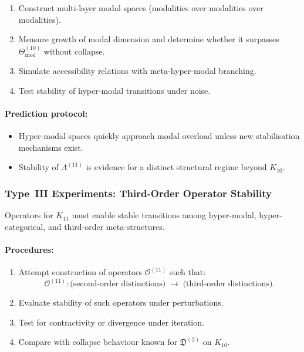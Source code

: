 \begin{enumerate}
    \item Construct multi-layer modal spaces 
          (modalities over modalities over modalities).
    \item Measure growth of modal dimension and 
          determine whether it surpasses 
          $\Theta_{\mathrm{mod}}^{(10)}$ without collapse.
    \item Simulate accessibility relations with 
          meta-hyper-modal branching.
    \item Test stability of hyper-modal transitions under noise.
\end{enumerate}

\paragraph{Prediction protocol:}

\begin{itemize}
    \item Hyper-modal spaces quickly approach modal overload unless 
          new stabilisation mechanisms exist.
    \item Stability of $\Lambda^{(11)}$ is evidence for a 
          distinct structural regime beyond $K_{10}$.
\end{itemize}



\subsubsection{Type~III Experiments: Third-Order Operator Stability}

Operators for $K_{11}$ must enable stable transitions among 
hyper-modal, hyper-categorical, and third-order meta-structures.

\paragraph{Procedures:}

\begin{enumerate}
    \item Attempt construction of operators $\mathcal{O}^{(11)}$ 
          such that:
          \[
              \mathcal{O}^{(11)} :
              \text{(second-order distinctions)}
                 \;\longrightarrow\;
              \text{(third-order distinctions)}.
          \]
    \item Evaluate stability of such operators under perturbations.
    \item Test for contractivity or divergence under iteration.
    \item Compare with collapse behaviour known for 
          $\mathfrak{D}^{(2)}$ on $K_{10}$.
\end{enumerate}

